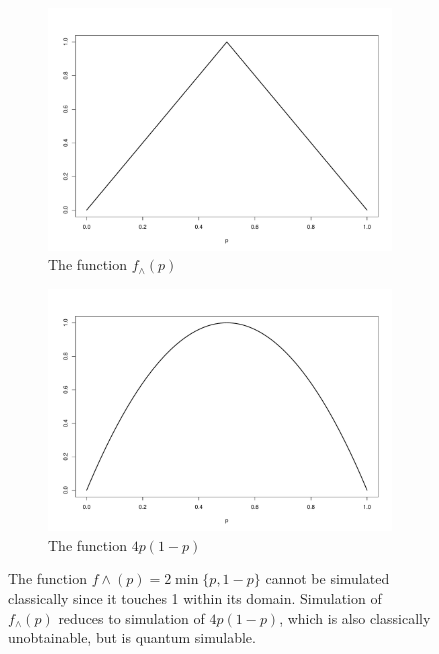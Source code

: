 \documentclass{article}
\theoremstyle{definition}
\begin{document}
\begin{figure} %
\centering
\begin{subfigure}{0.45\linewidth}
\centering
\includegraphics[width=\textwidth]{wedge_function.pdf}
\caption{The function $f_\wedge(p)$}
\label{fig:wedge_fn}
\end{subfigure}%
\hfill
\begin{subfigure}{0.45\linewidth}
\centering
\includegraphics[width=\textwidth]{wedge_qbf_fn.pdf}
\caption{The function $4p(1-p)$}
\label{fig:wedge_qbf_fn}
\end{subfigure}
\caption{The function $f\wedge(p)=2\min\{p, 1-p\}$ cannot be simulated classically since it touches 1 within its domain. Simulation of $f_\wedge(p)$ reduces to simulation of $4p(1-p)$, which is also classically unobtainable, but is quantum simulable.}
\end{figure}
\end{document}
